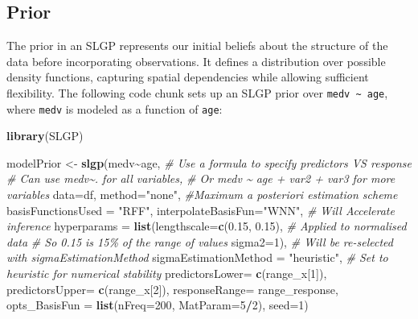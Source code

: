 \documentclass[
]{article}
\newenvironment{Shaded}{\begin{snugshade}}{\end{snugshade}}
\newcommand{\AttributeTok}[1]{\textcolor[rgb]{0.13,0.29,0.53}{#1}}
\newcommand{\CommentTok}[1]{\textcolor[rgb]{0.56,0.35,0.01}{\textit{#1}}}
\newcommand{\DecValTok}[1]{\textcolor[rgb]{0.00,0.00,0.81}{#1}}
\newcommand{\FloatTok}[1]{\textcolor[rgb]{0.00,0.00,0.81}{#1}}
\newcommand{\FunctionTok}[1]{\textcolor[rgb]{0.13,0.29,0.53}{\textbf{#1}}}
\newcommand{\NormalTok}[1]{#1}
\newcommand{\OtherTok}[1]{\textcolor[rgb]{0.56,0.35,0.01}{#1}}
\newcommand{\SpecialCharTok}[1]{\textcolor[rgb]{0.81,0.36,0.00}{\textbf{#1}}}
\newcommand{\StringTok}[1]{\textcolor[rgb]{0.31,0.60,0.02}{#1}}
\begin{document}
\subsection{Prior}\label{prior}

The prior in an SLGP represents our initial beliefs about the structure of the data before incorporating observations. It defines a distribution over possible density functions, capturing spatial dependencies while allowing sufficient flexibility.
The following code chunk sets up an SLGP prior over \texttt{medv\ \textasciitilde{}\ age}, where \texttt{medv} is modeled as a function of \texttt{age}:

\begin{Shaded}
\begin{Highlighting}[]
\FunctionTok{library}\NormalTok{(SLGP)}

\NormalTok{modelPrior }\OtherTok{\textless{}{-}} \FunctionTok{slgp}\NormalTok{(medv}\SpecialCharTok{\textasciitilde{}}\NormalTok{age, }\CommentTok{\# Use a formula to specify predictors VS response}
                   \CommentTok{\# Can use medv\textasciitilde{}. for all variables,}
                   \CommentTok{\# Or medv \textasciitilde{} age + var2 + var3 for more variables}
                   \AttributeTok{data=}\NormalTok{df,}
                   \AttributeTok{method=}\StringTok{"none"}\NormalTok{, }\CommentTok{\#Maximum a posteriori estimation scheme}
                   \AttributeTok{basisFunctionsUsed =} \StringTok{"RFF"}\NormalTok{,}
                   \AttributeTok{interpolateBasisFun=}\StringTok{"WNN"}\NormalTok{, }\CommentTok{\# Will Accelerate inference}
                   \AttributeTok{hyperparams =} \FunctionTok{list}\NormalTok{(}\AttributeTok{lengthscale=}\FunctionTok{c}\NormalTok{(}\FloatTok{0.15}\NormalTok{, }\FloatTok{0.15}\NormalTok{), }
                                      \CommentTok{\# Applied to normalised data}
                                      \CommentTok{\# So 0.15 is 15\% of the range of values}
                                      \AttributeTok{sigma2=}\DecValTok{1}\NormalTok{), }
                   \CommentTok{\# Will be re{-}selected with sigmaEstimationMethod}
                   \AttributeTok{sigmaEstimationMethod =} \StringTok{"heuristic"}\NormalTok{, }
                   \CommentTok{\# Set to heuristic for numerical stability                 }
                   \AttributeTok{predictorsLower=} \FunctionTok{c}\NormalTok{(range\_x[}\DecValTok{1}\NormalTok{]),}
                   \AttributeTok{predictorsUpper=} \FunctionTok{c}\NormalTok{(range\_x[}\DecValTok{2}\NormalTok{]),}
                   \AttributeTok{responseRange=}\NormalTok{ range\_response,}
                   \AttributeTok{opts\_BasisFun =} \FunctionTok{list}\NormalTok{(}\AttributeTok{nFreq=}\DecValTok{200}\NormalTok{,}
                                        \AttributeTok{MatParam=}\DecValTok{5}\SpecialCharTok{/}\DecValTok{2}\NormalTok{),}
                   \AttributeTok{seed=}\DecValTok{1}\NormalTok{)}
\end{Highlighting}
\end{Shaded}
\end{document}
